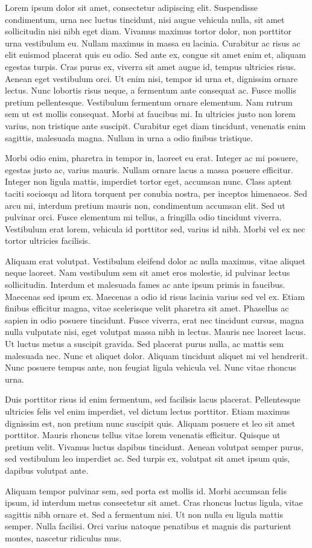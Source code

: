\documentclass[twocolumn]{article}
\begin{document}
	
	Lorem ipsum dolor sit amet, consectetur adipiscing elit. Suspendisse condimentum, urna nec luctus tincidunt, nisi augue vehicula nulla, sit amet sollicitudin nisi nibh eget diam. Vivamus maximus tortor dolor, non porttitor urna vestibulum eu. Nullam maximus in massa eu lacinia. Curabitur ac risus ac elit euismod placerat quis eu odio. Sed ante ex, congue sit amet enim et, aliquam egestas turpis. Cras purus ex, viverra sit amet augue id, tempus ultricies risus. Aenean eget vestibulum orci. Ut enim nisi, tempor id urna et, dignissim ornare lectus. Nunc lobortis risus neque, a fermentum ante consequat ac. Fusce mollis pretium pellentesque. Vestibulum fermentum ornare elementum. Nam rutrum sem ut est mollis consequat. Morbi at faucibus mi. In ultricies justo non lorem varius, non tristique ante suscipit. Curabitur eget diam tincidunt, venenatis enim sagittis, malesuada magna. Nullam in urna a odio finibus tristique.
	
	Morbi odio enim, pharetra in tempor in, laoreet eu erat. Integer ac mi posuere, egestas justo ac, varius mauris. Nullam ornare lacus a massa posuere efficitur. Integer non ligula mattis, imperdiet tortor eget, accumsan nunc. Class aptent taciti sociosqu ad litora torquent per conubia nostra, per inceptos himenaeos. Sed arcu mi, interdum pretium mauris non, condimentum accumsan elit. Sed ut pulvinar orci. Fusce elementum mi tellus, a fringilla odio tincidunt viverra. Vestibulum erat lorem, vehicula id porttitor sed, varius id nibh. Morbi vel ex nec tortor ultricies facilisis.
	
	Aliquam erat volutpat. Vestibulum eleifend dolor ac nulla maximus, vitae aliquet neque laoreet. Nam vestibulum sem sit amet eros molestie, id pulvinar lectus sollicitudin. Interdum et malesuada fames ac ante ipsum primis in faucibus. Maecenas sed ipsum ex. Maecenas a odio id risus lacinia varius sed vel ex. Etiam finibus efficitur magna, vitae scelerisque velit pharetra sit amet. Phasellus ac sapien in odio posuere tincidunt. Fusce viverra, erat nec tincidunt cursus, magna nulla vulputate nisi, eget volutpat massa nibh in lectus. Mauris nec laoreet lacus. Ut luctus metus a suscipit gravida. Sed placerat purus nulla, ac mattis sem malesuada nec. Nunc et aliquet dolor. Aliquam tincidunt aliquet mi vel hendrerit. Nunc posuere tempus ante, non feugiat ligula vehicula vel. Nunc vitae rhoncus urna.
	
	Duis porttitor risus id enim fermentum, sed facilisis lacus placerat. Pellentesque ultricies felis vel enim imperdiet, vel dictum lectus porttitor. Etiam maximus dignissim est, non pretium nunc suscipit quis. Aliquam posuere et leo sit amet porttitor. Mauris rhoncus tellus vitae lorem venenatis efficitur. Quisque ut pretium velit. Vivamus luctus dapibus tincidunt. Aenean volutpat semper purus, sed vestibulum leo imperdiet ac. Sed turpis ex, volutpat sit amet ipsum quis, dapibus volutpat ante.
	
	Aliquam tempor pulvinar sem, sed porta est mollis id. Morbi accumsan felis ipsum, id interdum metus consectetur sit amet. Cras rhoncus luctus ligula, vitae sagittis nibh ornare et. Sed a fermentum nisi. Ut non nulla eu ligula mattis semper. Nulla facilisi. Orci varius natoque penatibus et magnis dis parturient montes, nascetur ridiculus mus.
\end{document}
